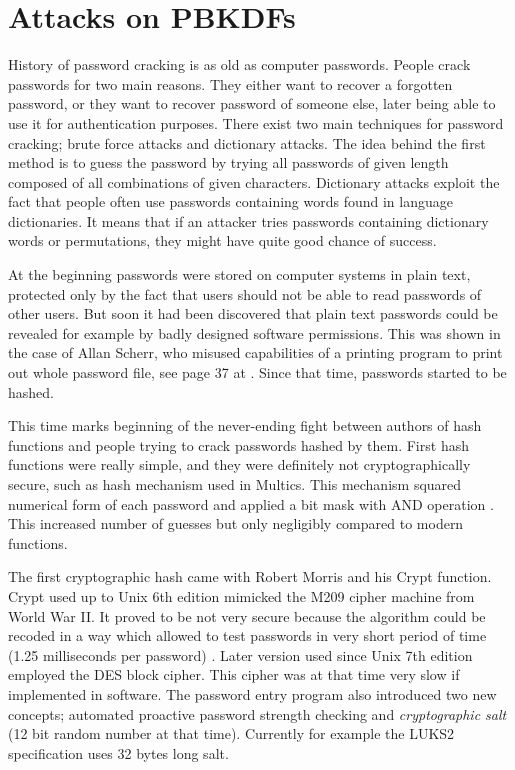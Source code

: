\documentclass[nolof]{fithesis3}
\begin{document}
\section{Attacks on PBKDFs}
\label{sec:attacks}
History of password cracking is as old as computer passwords. People crack passwords for two main reasons. They either want to recover a forgotten password, or they want to recover password of someone else, later being able to use it for authentication purposes. There exist two main techniques for password cracking; brute force attacks and dictionary attacks. The idea behind the first method is to guess the password by trying all passwords of given length composed of all combinations of given characters. Dictionary attacks exploit the fact that people often use passwords containing words found in language dictionaries. It means that if an attacker tries passwords containing dictionary words or permutations, they might have quite good chance of success.

At the beginning passwords were stored on computer systems in plain text, protected only by the fact that users should not be able to read passwords of other users. But soon it had been discovered that plain text passwords could be revealed for example by badly designed software permissions. This was shown in the case of Allan Scherr, who misused capabilities of a printing program to print out whole password file, see page 37 at \parencite{ctss}. Since that time, passwords started to be hashed.

This time marks beginning of the never-ending fight between authors of hash functions and people trying to crack passwords hashed by them. First hash functions were really simple, and they were definitely not cryptographically secure, such as hash mechanism used in Multics. This mechanism squared numerical form of each password and applied a bit mask with AND operation \parencite{multicssecurity}. This increased number of guesses but only negligibly compared to modern functions.

The first cryptographic hash came with Robert Morris and his Crypt function. Crypt used up to Unix 6th edition mimicked the M209 cipher machine from World War II. It proved to be not very secure because the algorithm could be recoded in a way which allowed to test passwords in very short period of time (1.25 milliseconds per password) \parencite{pshistory}. Later version used since Unix 7th edition employed the DES block cipher. This cipher was at that time very slow if implemented in software. The password entry program also introduced two new concepts; automated proactive password strength checking and \emph{cryptographic salt} (12 bit random number at that time). Currently for example the LUKS2 specification uses 32 bytes long salt.
\end{document}
